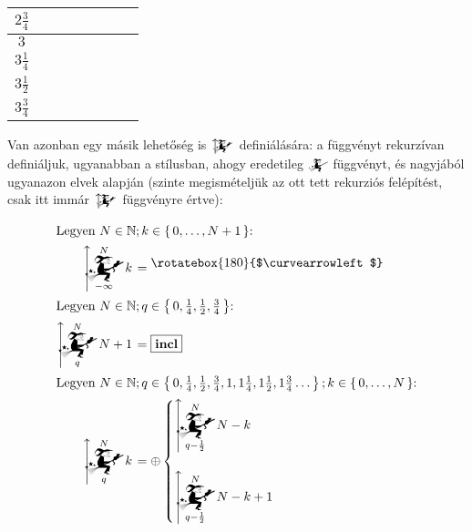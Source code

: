 \documentclass{article}
\newcommand{\blk}{\cellcolor{darkgray}}
\newcommand{\ylw}{\cellcolor{yellow}}
\newcommand{\nothing}{\text{\raisebox{0.4em}{\rotatebox{180}{$\curvearrowleft$}}}}%
\newcommand{\just}[1]{\boxed{#1}}%
\newcommand{\incl}{\mathbf{incl}}
\newcommand{\setOf}[1]{\left\lbrace\,#1\,\right\rbrace}
\newcommand{\mainfuncomm}[3]{\mathwitch_{#2}^{#1}#3}
\newcommand{\mainfunext}[3]{\left\uparrow\!\!\!\mathwitch*_{#2}^{#1}#3\right.}
\begin{document}
\begin{table}[H]
\begin{tabular}{c||c|c|c|c|c|c|c|}
		$2\frac34$	&	\ylw		&	\ylw		&	\ylw\nothing	&	\ylw\nothing	&	\ylw		&	\ylw		\\\hline
			$3$	&	\blk		&	\blk		&	\blk		&	\blk		&	\blk		&	\blk		\\\hline
		$3\frac14$	&	\ylw		&	\ylw		&	\ylw		&	\ylw		&	\ylw		&	\ylw		\\\hline
		$3\frac12$	&	\blk		&	\blk		&	\blk		&	\blk		&	\blk		&	\blk		\\\hline
		$3\frac34$	&	\ylw		&	\ylw		&	\ylw		&	\ylw		&	\ylw		&	\ylw		\\\hline
		\end{tabular}
	\end{table}

	Van azonban egy másik lehetőség is $\mainfunext{}{}{}$ definiálására: a függvényt rekurzívan definiáljuk, ugyanabban a stílusban, ahogy eredetileg $\mainfuncomm{}{}{}$ függvényt, és nagyjából ugyanazon elvek alapján (szinte megismételjük az ott tett rekurziós felépítést, csak itt immár $\mainfunext{}{}{}$ függvényre értve):


	\begin{align}
		\intertext{Legyen $N \in \mathbb N; k \in \setOf{0, \dots, N+1}$:}
		\mainfunext N{-\infty}k &= \nothing
		\\\intertext{Legyen $N \in \mathbb N; q \in \setOf{0, \frac14, \frac12, \frac34}$:}
		\mainfunext Nq{N+1} &= \just\incl
		\\\intertext{Legyen $N \in \mathbb N; q \in \setOf{0, \frac14, \frac12, \frac34, 1, 1\frac14, 1\frac12, 1\frac34 \dots}; k \in \setOf{0, \dots, N}$:}
		\mainfunext Nqk &= \oplus\begin{cases}\displaystyle\mainfunext N{q-\frac12}{N-k}&\\\\\displaystyle\mainfunext N{q-\frac12}{N-k+1}&\end{cases}
	\end{align}
\end{document}
